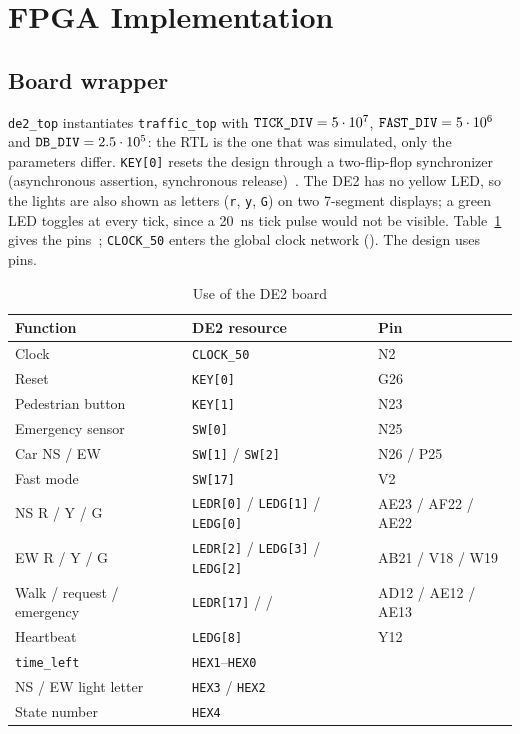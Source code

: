 \documentclass[conference]{IEEEtran}
\newcommand{\code}[1]{\texttt{\upshape #1}}
\begin{document}
\section{FPGA Implementation}\label{sec:fpga}

\subsection{Board wrapper}
\code{de2\_top} instantiates \code{traffic\_top} with $\code{TICK\_DIV} =
5\cdot10^{7}$, $\code{FAST\_DIV} = 5\cdot10^{6}$ and $\code{DB\_DIV} =
2.5\cdot10^{5}$: the RTL is the one that was simulated, only the parameters
differ. \code{KEY[0]} resets the design through a two-flip-flop synchronizer
(asynchronous assertion, synchronous release)~\cite{cummingsrst}. The DE2 has no yellow LED, so the
lights are also shown as letters (\code{r}, \code{y}, \code{G}) on two 7-segment
displays; a green LED toggles at every tick, since a 20~ns tick pulse would not be
visible. Table~\ref{tab:pins} gives the pins~\cite{de2}; \code{CLOCK\_50} enters
the global clock network (\ClockGlobal). The design uses \NumPins{} pins.

\begin{table}[t]
\centering
\caption{Use of the DE2 board}
\label{tab:pins}
\scriptsize
\setlength{\tabcolsep}{3pt}
\begin{tabular}{@{}l l l@{}}
\toprule
Function & DE2 resource & Pin \\
\midrule
Clock & \code{CLOCK\_50} & N2 \\
Reset & \code{KEY[0]} & G26 \\
Pedestrian button & \code{KEY[1]} & N23 \\
Emergency sensor & \code{SW[0]} & N25 \\
Car NS / EW & \code{SW[1]} / \code{SW[2]} & N26 / P25 \\
Fast mode & \code{SW[17]} & V2 \\
NS R / Y / G & \code{LEDR[0]} / \code{LEDG[1]} / \code{LEDG[0]} & AE23 / AF22 / AE22 \\
EW R / Y / G & \code{LEDR[2]} / \code{LEDG[3]} / \code{LEDG[2]} & AB21 / V18 / W19 \\
Walk / request / emergency & \code{LEDR[17]} / \code{[16]} / \code{[15]} & AD12 / AE12 / AE13 \\
Heartbeat & \code{LEDG[8]} & Y12 \\
\code{time\_left} & \code{HEX1}--\code{HEX0} & \\
NS / EW light letter & \code{HEX3} / \code{HEX2} & \\
State number & \code{HEX4} & \\
\bottomrule
\end{tabular}
\end{table}
\end{document}
